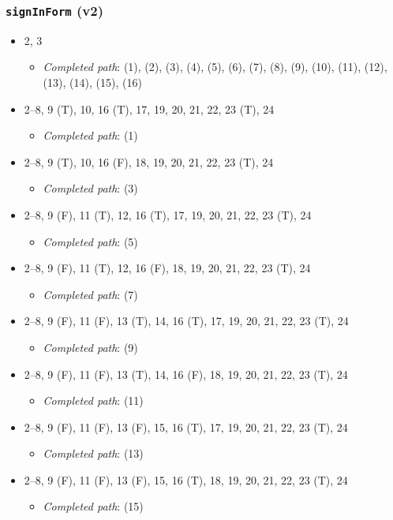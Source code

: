 \documentclass{article}
\newcommand{\completedpath}{\textit{Completed path}}
\begin{document}
\subsubsection*{\texttt{signInForm} (v2)}

\begin{itemize}
    \item 2, 3
    \begin{itemize}
        \item \completedpath: (1), (2), (3), (4), (5), (6), (7), (8), (9), (10), (11), (12), (13), (14), (15), (16)
    \end{itemize}
    \item 2--8, 9 (T), 10, 16 (T), 17, 19, 20, 21, 22, 23 (T), 24
    \begin{itemize}
        \item \completedpath: (1)
    \end{itemize}
    \item 2--8, 9 (T), 10, 16 (F), 18, 19, 20, 21, 22, 23 (T), 24
    \begin{itemize}
        \item \completedpath: (3)
    \end{itemize}
    \item 2--8, 9 (F), 11 (T), 12, 16 (T), 17, 19, 20, 21, 22, 23 (T), 24
    \begin{itemize}
        \item \completedpath: (5)
    \end{itemize}
    \item 2--8, 9 (F), 11 (T), 12, 16 (F), 18, 19, 20, 21, 22, 23 (T), 24
    \begin{itemize}
        \item \completedpath: (7)
    \end{itemize}
    \item 2--8, 9 (F), 11 (F), 13 (T), 14, 16 (T), 17, 19, 20, 21, 22, 23 (T), 24
    \begin{itemize}
        \item \completedpath: (9)
    \end{itemize}
    \item 2--8, 9 (F), 11 (F), 13 (T), 14, 16 (F), 18, 19, 20, 21, 22, 23 (T), 24
    \begin{itemize}
        \item \completedpath: (11)
    \end{itemize}
    \item 2--8, 9 (F), 11 (F), 13 (F), 15, 16 (T), 17, 19, 20, 21, 22, 23 (T), 24
    \begin{itemize}
        \item \completedpath: (13)
    \end{itemize}
    \item 2--8, 9 (F), 11 (F), 13 (F), 15, 16 (T), 18, 19, 20, 21, 22, 23 (T), 24
    \begin{itemize}
        \item \completedpath: (15)
    \end{itemize}
\end{itemize}
\end{document}
